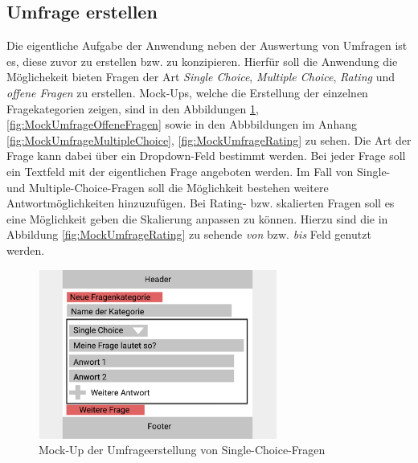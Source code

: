 \subsection{Umfrage erstellen}
\label{ssec:konzept:client:umfrage_erstellen}

Die eigentliche Aufgabe der Anwendung neben der Auswertung von Umfragen ist es, diese zuvor zu erstellen bzw. zu konzipieren.
Hierfür soll die Anwendung die Möglichekeit bieten Fragen der Art \emph{Single Choice}, \emph{Multiple Choice}, \emph{Rating} und \emph{offene Fragen} zu erstellen.
Mock-Ups, welche die Erstellung der einzelnen Fragekategorien zeigen, sind in den Abbildungen \ref{fig:MockUmfrageSingleChoice}, \ref{fig:MockUmfrageOffeneFragen} sowie in den Abbbildungen im Anhang \ref{fig:MockUmfrageMultipleChoice}, \ref{fig:MockUmfrageRating} zu sehen.
Die Art der Frage kann dabei über ein Dropdown-Feld bestimmt werden.
Bei jeder Frage soll ein Textfeld mit der eigentlichen Frage angeboten werden.
Im Fall von Single- und Multiple-Choice-Fragen soll die Möglichkeit bestehen weitere Antwortmöglichkeiten hinzuzufügen.
Bei Rating- bzw. skalierten Fragen soll es eine Möglichkeit geben die Skalierung anpassen zu können.
Hierzu sind die in Abbildung \ref{fig:MockUmfrageRating} zu sehende \emph{von} bzw. \emph{bis} Feld genutzt werden.

\begin{figure}[H]
	\centering
	\includegraphics[width=0.7\textwidth]{img/konzeption/client/umfrage_erstellen_single_choice}
	\captionsetup{justification=centering, format=plain}
	\caption[Mock-Up der Umfrageerstellung von Single-Choice-Fragen]{Mock-Up der Umfrageerstellung von Single-Choice-Fragen\\\figma}
	\label{fig:MockUmfrageSingleChoice}
\end{figure}

